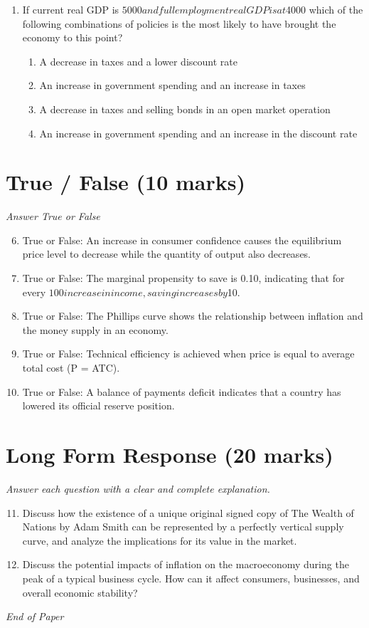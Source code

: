 \documentclass[12pt]{article}
\begin{document}
\begin{enumerate}[label=\arabic*.]
\begin{enumerate}[label=(\alph*)]
    \item diminishing returns to scale
\end{enumerate}
\item If current real GDP is $5000 and full employment real GDP is at $4000 which of the following combinations of policies is the most likely to have brought the economy to this point?
\begin{enumerate}[label=(\alph*)]
    \item A decrease in taxes and a lower discount rate
    \item An increase in government spending and an increase in taxes
    \item A decrease in taxes and selling bonds in an open market operation
    \item An increase in government spending and an increase in the discount rate
\end{enumerate}
\end{enumerate}

\section*{True / False (10 marks)}
\textit{Answer True or False}
\begin{enumerate}[label=\arabic*.]
\setcounter{enumi}{5}
\item True or False: An increase in consumer confidence causes the equilibrium price level to decrease while the quantity of output also decreases.
\item True or False: The marginal propensity to save is 0.10, indicating that for every $100 increase in income, saving increases by $10.
\item True or False: The Phillips curve shows the relationship between inflation and the money supply in an economy.
\item True or False: Technical efficiency is achieved when price is equal to average total cost (P = ATC).
\item True or False: A balance of payments deficit indicates that a country has lowered its official reserve position.
\end{enumerate}

\section*{Long Form Response (20 marks)}
\textit{Answer each question with a clear and complete explanation.}
\begin{enumerate}[label=\arabic*.]
\setcounter{enumi}{10}
\item Discuss how the existence of a unique original signed copy of The Wealth of Nations by Adam Smith can be represented by a perfectly vertical supply curve, and analyze the implications for its value in the market.
\item Discuss the potential impacts of inflation on the macroeconomy during the peak of a typical business cycle. How can it affect consumers, businesses, and overall economic stability?
\end{enumerate}

\vfill
\noindent\textit{End of Paper}
\end{document}
